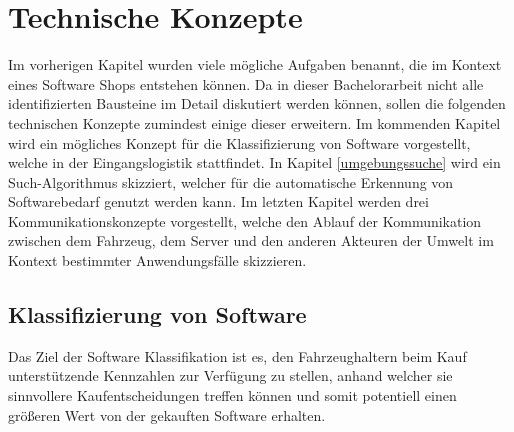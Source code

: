 \section{Technische Konzepte}\label{technische_konzepte}
Im vorherigen Kapitel wurden viele mögliche Aufgaben benannt, die im Kontext eines Software Shops entstehen können. Da in dieser Bachelorarbeit nicht alle identifizierten Bausteine im Detail diskutiert werden können, sollen die folgenden technischen Konzepte zumindest einige dieser erweitern. Im kommenden Kapitel wird ein mögliches Konzept für die Klassifizierung von Software vorgestellt, welche in der Eingangslogistik stattfindet. In Kapitel \ref{umgebungssuche} wird ein Such-Algorithmus skizziert, welcher für die automatische Erkennung von Softwarebedarf genutzt werden kann. Im letzten Kapitel werden drei Kommunikationskonzepte vorgestellt, welche den Ablauf der Kommunikation zwischen dem Fahrzeug, dem Server und den anderen Akteuren der Umwelt im Kontext bestimmter Anwendungsfälle skizzieren.
\subsection{Klassifizierung von Software}\label{sw_klassifizierung}
Das Ziel der Software Klassifikation ist es, den Fahrzeughaltern beim Kauf unterstützende Kennzahlen zur Verfügung zu stellen, anhand welcher sie sinnvollere Kaufentscheidungen treffen können und somit potentiell einen größeren Wert von der gekauften Software erhalten.

